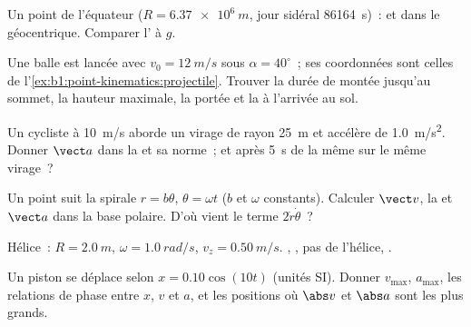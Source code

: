 \begin{exercise}[$\star$]\label{exo:b1:point-kinematics:3}
Un point de l'équateur ($R = \qty{6.37e6}{m}$, jour sidéral
\qty{86164}{s})~:  et  dans le 
géocentrique. Comparer l' à $g$.
\end{exercise}

\begin{exercise}[$\star$]\label{exo:b1:point-kinematics:4}
Une balle est lancée avec $v_0 = \qty{12}{m/s}$ sous $\alpha = 40^\circ$~;
ses coordonnées sont celles de l'\cref{ex:b1:point-kinematics:projectile}.
Trouver la durée de montée jusqu'au sommet, la hauteur maximale, la
portée et la  à l'arrivée au sol.
\end{exercise}

\begin{exercise}[$\star\star$]\label{exo:b1:point-kinematics:5}
Un cycliste à \qty{10}{m/s} aborde un virage de rayon \qty{25}{m} et
accélère de \qty{1.0}{m/s^2}. Donner $\vect a$ dans la  et
sa norme~; et après \qty{5}{s} de la même  sur le même virage~?
\end{exercise}

\begin{exercise}[$\star\star$]\label{exo:b1:point-kinematics:6}
Un point suit la spirale $r = b\theta$, $\theta = \omega t$ ($b$ et
$\omega$ constants). Calculer $\vect v$, la  et $\vect a$ dans la
base polaire. D'où vient le terme $2\dot r\dot\theta$~?
\end{exercise}

\begin{exercise}[$\star\star$]\label{exo:b1:point-kinematics:7}
Hélice~: $R = \qty{2.0}{m}$, $\omega = \qty{1.0}{rad/s}$, $v_z = \qty{0.50}{m/s}$.
, , pas de l'hélice, .
\end{exercise}

\begin{exercise}[$\star\star$]\label{exo:b1:point-kinematics:8}
Un piston se déplace selon $x = 0.10\cos(10t)$ (unités SI). Donner
$v_{\max}$, $a_{\max}$, les relations de phase entre $x$, $v$ et $a$, et
les positions où $\abs v$ et $\abs a$ sont les plus grands.
\end{exercise}

